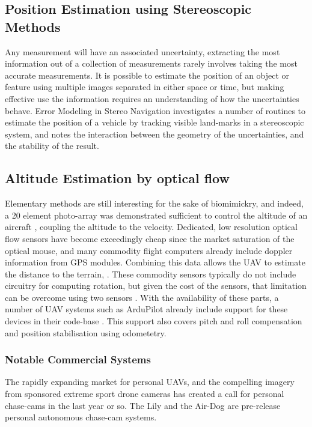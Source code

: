 \documentclass[a4paper, 11pt, titlepage]{article}
\begin{document}
    \subsection{Position Estimation using Stereoscopic Methods}
      Any measurement will have an associated uncertainty, extracting the most information out of a collection of measurements rarely involves taking the most accurate measurements.  It is possible to estimate the position of an object or feature using multiple images separated in either space or time, but making effective use the information requires an understanding of how the uncertainties behave.  Error Modeling in Stereo Navigation \cite{stereoUnc} investigates a number of routines to estimate the position of a vehicle by tracking visible land-marks in a stereoscopic system, and notes the interaction between the geometry of the uncertainties, and the stability of the result.

    \subsection{Altitude Estimation by optical flow}
      Elementary methods are still interesting for the sake of biomimickry, and indeed, a 20 element photo-array was demonstrated sufficient to control the altitude of an aircraft \cite{optoAlt}, coupling the altitude to the velocity.
      Dedicated, low resolution optical flow sensors have become exceedingly cheap since the market saturation of the optical mouse, and many commodity flight computers already include doppler information from GPS modules. 
      Combining this data allows the UAV to estimate the distance to the terrain, \cite{RemTerrain}.  These commodity sensors typically do not include circuitry for computing rotation, but given the cost of the sensors, that limitation can be overcome using two sensors \cite{FlowRot}.
      With the availability of these parts, a number of UAV systems such as ArduPilot already include support for these devices in their code-base \cite{ArduFlow}.
      This support also covers pitch and roll compensation and position stabilisation using odometetry.

    \subsubsection{Notable Commercial Systems}
      The rapidly expanding market for personal UAVs, and the compelling imagery from sponsored extreme sport drone cameras has created a call for personal chase-cams in the last year or so.  The Lily \cite{Lily} and the Air-Dog \cite{AirDog} are pre-release personal autonomous chase-cam systems.
\end{document}
